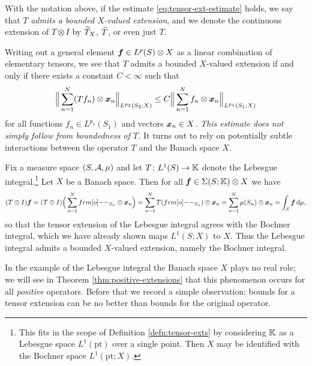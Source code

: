 \begin{defn}
  With the notation above, if the estimate \eqref{eq:tensor-ext-estimate} holds, we say that $T$ \emph{admits a bounded $X$-valued extension}, and we denote the continuous extension of $T \otimes I$ by $\widetilde{T}_X$, $\widetilde{T}$, or even just $T$.
\end{defn}

Writing out a general element $\bm{f} \in L^p(S) \otimes X$ as a linear combination of elementary tensors, we see that $T$ admits a bounded $X$-valued extension if and only if there exists a constant $C < \infty$ such that
\begin{equation}\label{eq:tensor-ext-estimate-full}
  \Big\|\sum_{n=1}^N (Tf_n) \otimes \bm{x}_n\Big\|_{L^{p_2}(S_2;X)} \leq C \Big\|\sum_{n=1}^N f_n \otimes \bm{x}_n\Big\|_{L^{p_1}(S_1;X)}
\end{equation}
for all functions $f_n \in L^{p_1}(S_1)$ and vectors $\bm{x}_n \in X$.
\emph{This estimate does not simply follow from boundedness of $T$.}
It turns out to rely on potentially subtle interactions between the operator $T$ and the Banach space $X$.

\begin{example}
  Fix a measure space $(S,\mathcal{A},\mu)$ and let $T \colon L^1(S) \rightarrow \mathbb{K}$ denote the Lebesgue integral.\footnote{This fits in the scope of Definition \ref{defn:tensor-exts} by considering $\mathbb{K}$ as a Lebesgue space $L^1(\mathrm{pt})$ over a single point. Then $X$ may be identified with the Bochner space $L^1(\mathrm{pt};X)$.}
  Let $X$ be a Banach space.
  Then for all $\bm{f} \in \Sigma(S;\mathbb{K}) \otimes X$ we have
  \begin{equation*}
    (T \otimes I)\mb{f} = (T \otimes I)\Big(\sum_{n=1}^N \1_{S_n} \otimes \mb{x}_n \Big) = \sum_{n=1}^N T(\1_{S_n}) \otimes \mb{x}_n = \sum_{n=1}^N \mu(S_n) \otimes \mb{x}_n = \int_S \mb{f} \, \dd\mu,
  \end{equation*}
  so that the tensor extension of the Lebesgue integral agrees with the Bochner integral, which we have already shown maps $L^1(S;X)$ to $X$.
  Thus the Lebesgue integral admits a bounded $X$-valued extension, namely the Bochner integral.
\end{example}

In the example of the Lebesgue integral the Banach space $X$ plays no real role; we will see in Theorem \ref{thm:positive-extensions} that this phenomenon occurs for all \emph{positive} operators.
Before that we record a simple observation: bounds for a tensor extension can be no better than bounds for the original operator.

